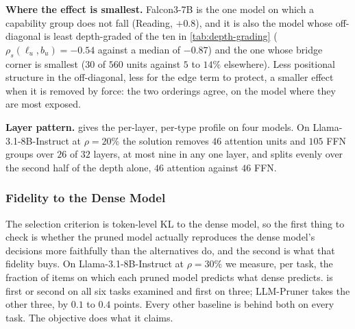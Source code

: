 \textbf{Where the effect is smallest.} Falcon3-7B is the one model on which a capability group does
not fall (Reading, $+0.8$), and it is also the model whose off-diagonal is least depth-graded of the
ten in \cref{tab:depth-grading} ($\rho_s(\ell_u,b_u)=-0.54$ against a median of $-0.87$) and the one
whose bridge corner is smallest ($30$ of $560$ units against $5$ to $14\%$ elsewhere). Less positional
structure in the off-diagonal, less for the edge term to protect, a smaller effect when it is removed
by force: the two orderings agree, on the model where they are most exposed.

\begin{table}[htbp]
\centering\footnotesize
\caption{\textbf{The bridge test, on every model we build $\Hmat$ for} ($\rho{=}20\%$). Low-saliency
units split by off-diagonal connectivity, matched unit-for-unit on saliency, unit type and cost, with
one greedy fill shared by both arms. Each pair holds the same number of units at the same removed cost
and the same realised ratio. Nineteen of the twenty capability cells fall; on three of the five models
perplexity moves the other way, on one it is flat, and on Mistral-Small-24B it agrees with them. The
Mistral-Small-24B pair is pruned on the second server and enters from its export ($170$ units per arm,
realised ratio $0.2014$).}
\label{tab:bridge-models}

\end{table}

\textbf{Layer pattern.}  gives the per-layer, per-type profile on four models.
On Llama-3.1-8B-Instruct at $\rho{=}20\%$ the solution removes $46$ attention units and $105$ FFN
groups over $26$ of $32$ layers, at most nine in any one layer, and splits evenly over the second
half of the depth alone, $46$ attention against $46$ FFN.

\subsubsection{Fidelity to the Dense Model}
\label{app:fidelity}
The selection criterion is token-level KL to the dense model, so the first thing to check is
whether the pruned model actually reproduces the dense model's decisions more faithfully than the
alternatives do, and the second is what that fidelity buys. On
Llama-3.1-8B-Instruct at $\rho{=}30\%$ we measure, per task, the fraction of items on which each
pruned model predicts what dense predicts. \method is first or second on all six tasks examined and
first on three; LLM-Pruner takes the other three, by $0.1$ to $0.4$ points. Every other baseline is
behind both on every task. The objective does what it claims.

